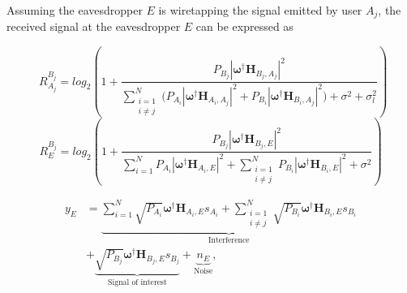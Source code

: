 \documentclass[lettersize,journal]{IEEEtran}
\begin{document}
Assuming the eavesdropper $E$ is wiretapping the signal emitted by user $A_j$, the received signal at the eavesdropper $E$ can be expressed as


\begin{figure}[!t]
\normalsize
\begin{equation}
\label{eqn_dbl_x}
R_{A_j}^{B_j} = log_2 \left(1+ \frac{P_{B_j}|\boldsymbol{\omega}^\dag \mathbf{H}_{B_j,A_j}|^2}{\sum_{\substack{i=1 \\ i\neq j}}^N { ( P_{A_i}|\boldsymbol{\omega}^\dag \mathbf{H}_{A_i,A_j}|^2} + P_{B_i}|\boldsymbol{\omega}^\dag \mathbf{H}_{B_i,A_j}|^2 ) + \sigma^2 + \sigma_{l}^2}\right)
\end{equation}
\begin{equation}
\label{eqn_dbl_y}
R_{E}^{B_j} = log_2 \left(1+ \frac{P_{B_j}|\boldsymbol{\omega}^\dag \mathbf{H}_{B_j,E}|^2}{\sum_{i=1}^N {P_{A_i}|\boldsymbol{\omega}^\dag \mathbf{H}_{A_i,E}|^2} + \sum_{\substack{i=1 \\ i\neq j}}^N {P_{B_i}|\boldsymbol{\omega}^\dag \mathbf{H}_{B_i,E}|^2} + \sigma^2}\right)
\end{equation}
\hrulefill
\end{figure}



\begin{equation}
\label{eqn2}
\begin{split}
 y_{E} & = \underbrace{\sum_{i=1}^{N} \sqrt{P_{A_i}} \boldsymbol{\omega}^\dag \mathbf{H}_{A_i,E}s_{A_i} + \sum_{\substack{i=1 \\ i\neq j}}^{N} \sqrt{P_{B_i}} \boldsymbol{\omega}^\dag \mathbf{H}_{B_i,E}s_{B_i}}_{\text{Interference}} \\&+ \underbrace{\sqrt{P_{B_j}} \boldsymbol{\omega}^\dag \mathbf{H}_{B_j,E}s_{B_j}}_{\text{Signal of interest}} + \underbrace{n_{E}}_{\text{Noise}} ,
\end{split}
\end{equation}
\end{document}
